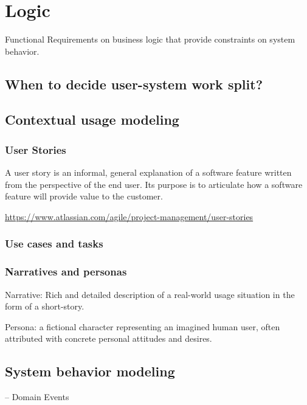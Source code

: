
\chapter{Logic}%

Functional Requirements on business logic that provide constraints on system behavior.


\section{When to decide user-system work split?}

\section{Contextual usage modeling}%

\subsection{User Stories}

A user story is an informal, general explanation of a software feature written from the perspective of the end user. Its purpose is to articulate how a software feature will provide value to the customer.

\url{https://www.atlassian.com/agile/project-management/user-stories}

\subsection{Use cases and tasks}

\subsection{Narratives and personas}

Narrative: Rich and detailed description of a real-world usage situation in the form of a short-story.

Persona: a fictional character representing an imagined human user, often attributed with concrete personal attitudes and desires. 


\section{System behavior modeling}

-- Domain Events

